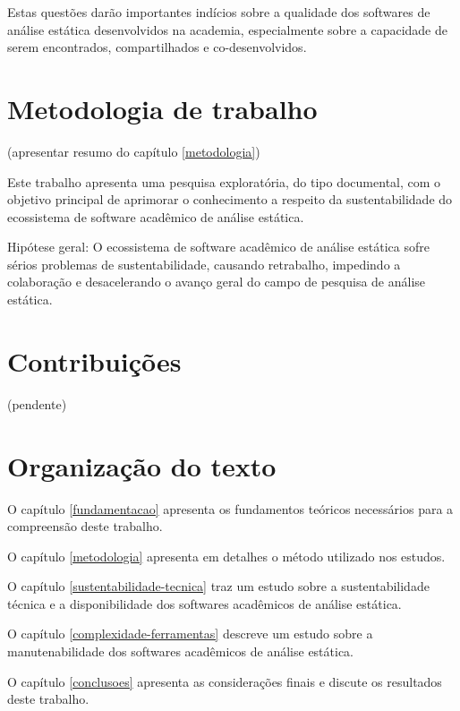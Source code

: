 

Estas questões darão importantes indícios sobre a qualidade dos softwares de
análise estática desenvolvidos na academia, especialmente sobre a capacidade de
serem encontrados, compartilhados e co-desenvolvidos.

\section{Metodologia de trabalho}

(apresentar resumo do capítulo \ref{metodologia})

Este trabalho apresenta uma pesquisa exploratória, do tipo documental, com o
objetivo principal de aprimorar o conhecimento a respeito da sustentabilidade
do ecossistema de software acadêmico de análise estática.

Hipótese geral: O ecossistema de software acadêmico de análise
estática sofre sérios problemas de sustentabilidade, causando retrabalho,
impedindo a colaboração e desacelerando o avanço geral do campo de pesquisa de
análise estática.


\section{Contribuições}

(pendente)

\section{Organização do texto}

O capítulo \ref{fundamentacao} apresenta os fundamentos teóricos necessários
para a compreensão deste trabalho.

O capítulo \ref{metodologia} apresenta em detalhes o método utilizado nos
estudos.

O capítulo \ref{sustentabilidade-tecnica} traz um estudo sobre a
sustentabilidade técnica e a disponibilidade dos softwares acadêmicos de
análise estática.

O capítulo \ref{complexidade-ferramentas} descreve um estudo sobre a
manutenabilidade dos softwares acadêmicos de análise estática.

O capítulo \ref{conclusoes} apresenta as considerações finais e discute os
resultados deste trabalho.


